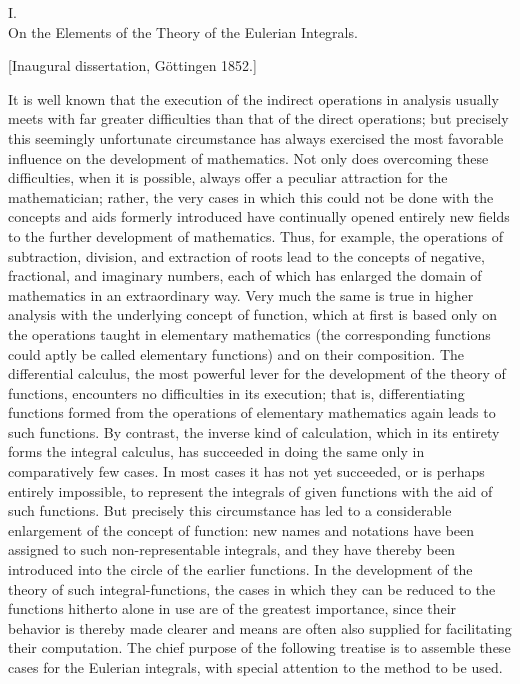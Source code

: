 \documentclass[11pt]{article}
\begin{document}
\begin{center}
{\Large I.\\[0.4em] On the Elements of the Theory of the Eulerian Integrals.}\par
\medskip
{\normalsize [Inaugural dissertation, Göttingen 1852.]}
\end{center}

It is well known that the execution of the indirect operations in analysis usually meets with far greater difficulties than that of the direct operations; but precisely this seemingly unfortunate circumstance has always exercised the most favorable influence on the development of mathematics. Not only does overcoming these difficulties, when it is possible, always offer a peculiar attraction for the mathematician; rather, the very cases in which this could not be done with the concepts and aids formerly introduced have continually opened entirely new fields to the further development of mathematics. Thus, for example, the operations of subtraction, division, and extraction of roots lead to the concepts of negative, fractional, and imaginary numbers, each of which has enlarged the domain of mathematics in an extraordinary way. Very much the same is true in higher analysis with the underlying concept of function, which at first is based only on the operations taught in elementary mathematics (the corresponding functions could aptly be called elementary functions) and on their composition. The differential calculus, the most powerful lever for the development of the theory of functions, encounters no difficulties in its execution; that is, differentiating functions formed from the operations of elementary mathematics again leads to such functions. By contrast, the inverse kind of calculation, which in its entirety forms the integral calculus, has succeeded in doing the same only in comparatively few cases. In most cases it has not yet succeeded, or is perhaps entirely impossible, to represent the integrals of given functions with the aid of such functions. But precisely this circumstance has led to a considerable enlargement of the concept of function: new names and notations have been assigned to such non-representable integrals, and they have thereby been introduced into the circle of the earlier functions. In the development of the theory of such integral-functions, the cases in which they can be reduced to the functions hitherto alone in use are of the greatest importance, since their behavior is thereby made clearer and means are often also supplied for facilitating their computation. The chief purpose of the following treatise is to assemble these cases for the Eulerian integrals, with special attention to the method to be used.
\end{document}
